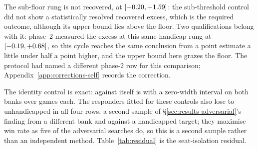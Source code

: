 The sub-floor rung is not recovered, at \vsevenBnineHfiveExcess{}
$[-0.20, +1.59]$: the sub-threshold control did not show a
statistically resolved recovered excess, which is the required outcome, although its upper bound
lies above the floor. Two qualifications belong with it: phase~2 measured the excess at this same handicap rung at
\vsevenSubFloorExcess{} $[-0.19, +0.68]$, so this cycle reaches
the same conclusion from a point estimate a little under half a point higher, and the upper bound
here grazes the floor. The protocol had named a different phase-2 row for this comparison;
Appendix~\ref{app:corrections-self} records the correction.

The identity control is exact: \sestina{} against itself is \vsevenIdentityRate{} with a
zero-width interval on both banks over \vsevenIdentityN{} games each. The responders fitted for these
controls also lose to unhandicapped \sestina{} in all four rows, a second sample of
\S\ref{sec:results-adversarial}'s finding from a different bank and against a handicapped target;
they maximise win rate as five of the \vsevenBfourArmsWord{} adversarial searches do, so this is a second sample
rather than an independent method. Table~\ref{tab:residual} is the seat-isolation residual.

\begin{table}[!ht]\centering
\caption{The seat-isolation residual on holdout material, \vsevenSsixCells{} cells over
\vsevenSsixDeals{} audited deals: decisions the S6 reconstruction could not reproduce from own hand,
public record, rules and reset seed, over decisions audited. The right column is the registered
zero-tolerance condition (one worker thread, agents rebuilt per deal); the left column is one
worker thread with reused agents. Neither column is the scored mode, which used
\vsevenScoredThreads{} worker threads with reused agents and was not audited on holdout.}
\label{tab:residual}
{\tabfont}
\end{table}

